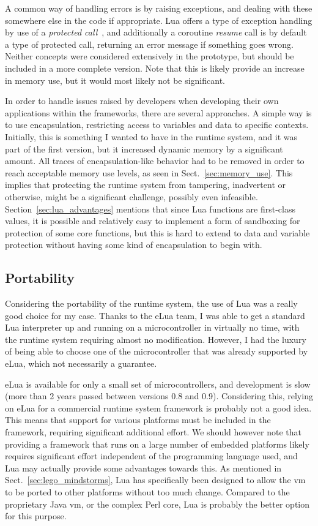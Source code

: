 A common way of handling errors is by raising exceptions, and dealing with these somewhere else in the code if appropriate. Lua offers a type of exception handling by use of a \emph{protected call}~\cite[Ch.8.4]{book:programming_in_lua_first}, and additionally a coroutine \emph{resume} call is by default a type of protected call, returning an error message if something goes wrong. Neither concepts were considered extensively in the prototype, but should be included in a more complete version. Note that this is likely provide an increase in memory use, but it would most likely not be significant.

In order to handle issues raised by developers when developing their own applications within the frameworks, there are several approaches. A simple way is to use encapsulation, restricting access to variables and data to specific contexts. Initially, this is something I wanted to have in the runtime system, and it was part of the first version, but it increased dynamic memory by a significant amount. All traces of encapsulation-like behavior had to be removed in order to reach acceptable memory use levels, as seen in Sect.~\ref{sec:memory_use}. This implies that protecting the runtime system from tampering, inadvertent or otherwise, might be a significant challenge, possibly even infeasible. Section~\ref{sec:lua_advantages} mentions that since Lua functions are first-class values, it is possible and relatively easy to implement a form of sandboxing for protection of some core functions, but this is hard to extend to data and variable protection without having some kind of encapsulation to begin with.

\subsection{Portability}
\label{sec:disq_portability}
Considering the portability of the runtime system, the use of Lua was a really good choice for my case. Thanks to the eLua team, I was able to get a standard Lua interpreter up and running on a microcontroller in virtually no time, with the runtime system requiring almost no modification. However, I had the luxury of being able to choose one of the microcontroller that was already supported by eLua, which not necessarily a guarantee.

eLua is available for only a small set of microcontrollers, and development is slow (more than 2 years passed between versions 0.8 and 0.9). Considering this, relying on eLua for a commercial runtime system framework is probably not a good idea. This means that support for various platforms must be included in the framework, requiring significant additional effort. We should however note that providing a framework that runs on a large number of embedded platforms likely requires significant effort independent of the programming language used, and Lua may actually provide some advantages towards this. As mentioned in Sect.~\ref{sec:lego_mindstorms}, Lua has specifically been designed to allow the \gls{vm} to be ported to other platforms without too much change. Compared to the proprietary Java \gls{vm}, or the complex Perl core, Lua is probably the better option for this purpose.

